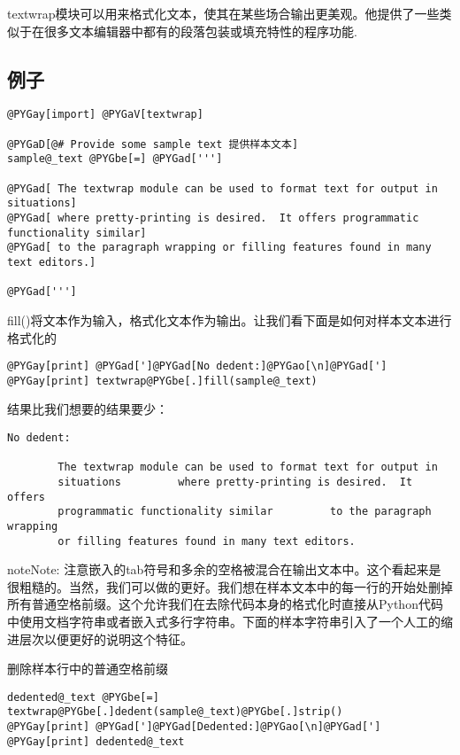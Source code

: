 \documentclass[a4paper,10pt,english]{manual}
\begin{document}
textwrap模块可以用来格式化文本，使其在某些场合输出更美观。他提供了一些类似于在很多文本编辑器中都有的段落包装或填充特性的程序功能.


\subsection{例子}

\begin{Verbatim}[commandchars=@\[\]]
@PYGay[import] @PYGaV[textwrap]

@PYGaD[@# Provide some sample text 提供样本文本]
sample@_text @PYGbe[=] @PYGad[''']

@PYGad[ The textwrap module can be used to format text for output in situations]
@PYGad[ where pretty-printing is desired.  It offers programmatic functionality similar]
@PYGad[ to the paragraph wrapping or filling features found in many text editors.]

@PYGad[''']
\end{Verbatim}

fill()将文本作为输入，格式化文本作为输出。让我们看下面是如何对样本文本进行格式化的

\begin{Verbatim}[commandchars=@\[\]]
@PYGay[print] @PYGad[']@PYGad[No dedent:]@PYGao[\n]@PYGad[']
@PYGay[print] textwrap@PYGbe[.]fill(sample@_text)
\end{Verbatim}

结果比我们想要的结果要少：

\begin{Verbatim}[commandchars=@\[\]]
No dedent:

        The textwrap module can be used to format text for output in
        situations         where pretty-printing is desired.  It offers
        programmatic functionality similar         to the paragraph wrapping
        or filling features found in many text editors.
\end{Verbatim}

\begin{notice}{note}{Note:}
注意嵌入的tab符号和多余的空格被混合在输出文本中。这个看起来是很粗糙的。当然，我们可以做的更好。我们想在样本文本中的每一行的开始处删掉所有普通空格前缀。这个允许我们在去除代码本身的格式化时直接从Python代码中使用文档字符串或者嵌入式多行字符串。下面的样本字符串引入了一个人工的缩进层次以便更好的说明这个特征。
\end{notice}

删除样本行中的普通空格前缀

\begin{Verbatim}[commandchars=@\[\]]
dedented@_text @PYGbe[=] textwrap@PYGbe[.]dedent(sample@_text)@PYGbe[.]strip()
@PYGay[print] @PYGad[']@PYGad[Dedented:]@PYGao[\n]@PYGad[']
@PYGay[print] dedented@_text
\end{Verbatim}
\end{document}
